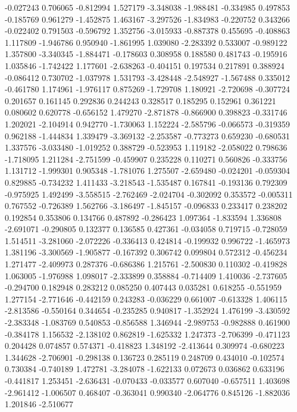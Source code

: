 -0.027243
0.706065
-0.812994
1.527179
-3.348038
-1.988481
-0.334985
0.497853
-0.185769
0.961279
-1.452875
1.463167
-3.297526
-1.834983
-0.220752
0.343266
-0.022402
0.791503
-0.596792
1.352756
-3.015933
-0.887378
0.455695
-0.408863
1.117809
-1.946786
0.950940
-1.861995
1.039080
-2.283392
0.533007
-0.989122
1.357800
-3.340345
-1.884471
-0.178603
0.308958
0.188580
0.481743
-0.195916
1.035846
-1.742422
1.177601
-2.638263
-0.404151
0.197534
0.217891
0.388924
-0.086412
0.730702
-1.037978
1.531793
-3.428448
-2.548927
-1.567488
0.335012
-0.461780
1.174961
-1.976117
0.875269
-1.729708
1.180921
-2.720698
-0.307724
0.201657
0.161145
0.292836
0.244243
0.328517
0.185295
0.152961
0.361221
0.080602
0.620778
-0.656152
1.479270
-2.871878
-0.866900
0.398823
-0.331746
1.202021
-2.104914
0.942770
-1.730063
1.152224
-2.585796
-0.066573
-0.319359
0.962188
-1.444834
1.339479
-3.369132
-2.253587
-0.773273
0.659230
-0.680531
1.337576
-3.033480
-1.019252
0.388729
-0.523953
1.119182
-2.058022
0.798636
-1.718095
1.211284
-2.751599
-0.459907
0.235228
0.110271
0.560826
-0.333756
1.131712
-1.999301
0.905348
-1.781076
1.275507
-2.659480
-0.024201
-0.059304
0.829885
-0.734232
1.411433
-3.218543
-1.535487
0.167841
-0.193136
0.792309
-0.975925
1.492499
-3.558515
-2.762469
-2.024704
-0.302092
0.353572
-0.005311
0.767552
-0.726389
1.562766
-3.186497
-1.845157
-0.096833
0.233417
0.238202
0.192854
0.353806
0.134766
0.487892
-0.286423
1.097364
-1.833594
1.336808
-2.691071
-0.290805
0.132377
0.136585
0.427361
-0.034058
0.719715
-0.728059
1.514511
-3.281060
-2.072226
-0.336413
0.424814
-0.199932
0.996722
-1.465973
1.381196
-3.300569
-1.905877
-0.167392
0.306742
0.099804
0.572312
-0.456234
1.271477
-2.409973
0.287376
-0.686386
1.215761
-2.500830
0.110302
-0.419828
1.063005
-1.976988
1.098017
-2.333899
0.358884
-0.714409
1.410036
-2.737605
-0.294700
0.182948
0.283212
0.085250
0.407443
0.035281
0.618255
-0.551959
1.277154
-2.771646
-0.442159
0.243283
-0.036229
0.661007
-0.613328
1.406115
-2.813586
-0.550164
0.344654
-0.235285
0.940817
-1.352924
1.476199
-3.430592
-2.383348
-1.083769
0.540853
-0.856588
1.346944
-2.989753
-0.982888
0.461900
-0.384178
1.156532
-2.138102
0.862819
-1.625332
1.247373
-2.706399
-0.471123
0.204428
0.074857
0.574371
-0.418823
1.348192
-2.413644
0.309974
-0.680223
1.344628
-2.706901
-0.298138
0.136723
0.285119
0.248709
0.434010
-0.102574
0.730384
-0.740189
1.472781
-3.284078
-1.622133
0.072673
0.036862
0.633196
-0.441817
1.253451
-2.636431
-0.070433
-0.033577
0.607040
-0.657511
1.403698
-2.961412
-1.006507
0.468407
-0.363041
0.990340
-2.064776
0.845126
-1.882036
1.201846
-2.510677
